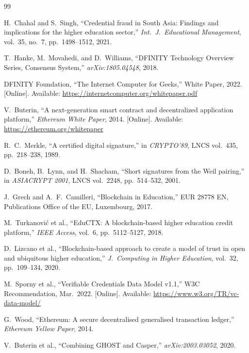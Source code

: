 \documentclass[conference]{IEEEtran}
\begin{document}
\begin{thebibliography}{99}

H.~Chahal and S.~Singh,
``Credential fraud in South Asia: Findings and implications for the higher education sector,''
\textit{Int.\ J.\ Educational Management}, vol.~35, no.~7, pp.~1498--1512, 2021.

T.~Hanke, M.~Movahedi, and D.~Williams,
``DFINITY Technology Overview Series, Consensus System,''
\textit{arXiv:1805.04548}, 2018.

DFINITY Foundation,
``The Internet Computer for Geeks,''
White Paper, 2022.
[Online]. Available: \url{https://internetcomputer.org/whitepaper.pdf}

V.~Buterin,
``A next-generation smart contract and decentralized application platform,''
\textit{Ethereum White Paper}, 2014.
[Online]. Available: \url{https://ethereum.org/whitepaper}

R.~C.~Merkle,
``A certified digital signature,''
in \textit{CRYPTO'89}, LNCS vol.~435, pp.~218--238, 1989.

D.~Boneh, B.~Lynn, and H.~Shacham,
``Short signatures from the Weil pairing,''
in \textit{ASIACRYPT 2001}, LNCS vol.~2248, pp.~514--532, 2001.

J.~Grech and A.~F.~Camilleri,
``Blockchain in Education,''
EUR 28778 EN, Publications Office of the EU, Luxembourg, 2017.

M.~Turkanovi\'{c} et al.,
``EduCTX: A blockchain-based higher education credit platform,''
\textit{IEEE Access}, vol.~6, pp.~5112--5127, 2018.

D.~Lizcano et al.,
``Blockchain-based approach to create a model of trust in open and ubiquitous higher education,''
\textit{J.\ Computing in Higher Education}, vol.~32, pp.~109--134, 2020.

M.~Sporny et al.,
``Verifiable Credentials Data Model v1.1,''
W3C Recommendation, Mar.\ 2022.
[Online]. Available: \url{https://www.w3.org/TR/vc-data-model/}

G.~Wood,
``Ethereum: A secure decentralised generalised transaction ledger,''
\textit{Ethereum Yellow Paper}, 2014.

V.~Buterin et al.,
``Combining GHOST and Casper,''
\textit{arXiv:2003.03052}, 2020.


\end{thebibliography}
\end{document}
